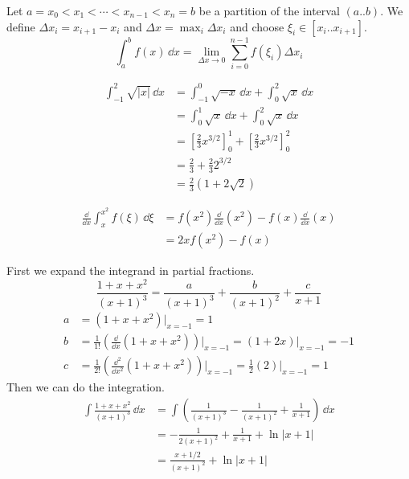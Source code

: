 \begin{QuizSolution}
  \label{quiz solution limit sum definition}
  Let $a = x_0 < x_1 < \cdots < x_{n-1} < x_n = b$
  be a partition of the interval $(a..b)$.
  We define $\Delta x_i = x_{i+1} - x_i$ and $\Delta x = \max_i \Delta x_i$
  and choose $\xi_i \in [x_i .. x_{i+1}]$.
  \[
  \int_a^b f(x) \,\dd x
  = \lim_{\Delta x \to 0} \sum_{i = 0}^{n-1} f(\xi_i) \Delta x_i
  \]
\end{QuizSolution}


\begin{QuizSolution}
  \label{quiz solution int sqrt |x|}
  \begin{align*}
    \int_{-1}^2 \sqrt{|x|} \,\dd x
    &= \int_{-1}^0 \sqrt{-x}\,\dd x + \int_0^2 \sqrt{x}\,\dd x 
    \\
    &= \int_0^1 \sqrt{x}\,\dd x + \int_0^2 \sqrt{x}\,\dd x 
    \\
    &= \left[ \frac{2}{3} x^{3/2} \right]_0^1
    + \left[ \frac{2}{3} x^{3/2} \right]_0^2 
    \\
    &= \frac{2}{3} + \frac{2}{3} 2^{3/2} 
    \\
    &= \frac{2}{3} (1 + 2 \sqrt{2} )
  \end{align*}
\end{QuizSolution}


\begin{QuizSolution}
  \label{quiz solution ddx int x x2 f}
  \begin{align*}
    \frac{\dd}{\dd x} \int_x^{x^2} f(\xi) \,\dd \xi
    &= f(x^2) \frac{\dd}{\dd x}(x^2) 
    - f(x) \frac{\dd}{\dd x} (x)
    \\
    &= 2 x f(x^2) - f(x)
  \end{align*}
\end{QuizSolution}


\begin{QuizSolution}
  \label{quiz solution int 1xx2 x13}
  First we expand the integrand in partial fractions.
  \[
  \frac{1+x+x^2}{(x+1)^3} = \frac{a}{(x+1)^3} + \frac{b}{(x+1)^2}
  + \frac{c}{x+1}
  \]
  \begin{align*}
    a &= (1+x+x^2)\big|_{x=-1} = 1 
    \\
    b &= \frac{1}{1!} \left(\frac{\dd}{\dd x} (1+x+x^2) \right) \bigg|_{x=-1} 
    = \left( 1+2x\right) \big|_{x=-1}  = -1 
    \\
    c &= \frac{1}{2!} \left(\frac{\dd^2}{\dd x^2} (1+x+x^2) \right) \bigg|_{x=-1} 
    = \frac{1}{2} \left( 2 \right) \big|_{x=-1}  = 1 
  \end{align*}
  Then we can do the integration.
  \begin{align*}
    \int \frac{1+x+x^2}{(x+1)^3} \,\dd x 
    &= \int \left( \frac{1}{(x+1)^3} - \frac{1}{(x+1)^2} + \frac{1}{x+1} \right)
    \,\dd x 
    \\
    &= -\frac{1}{2 (x+1)^2} + \frac{1}{x+1} + \ln |x+1| 
    \\
    &= \frac{x + 1/2}{(x+1)^2} + \ln |x+1|
  \end{align*}
\end{QuizSolution}


